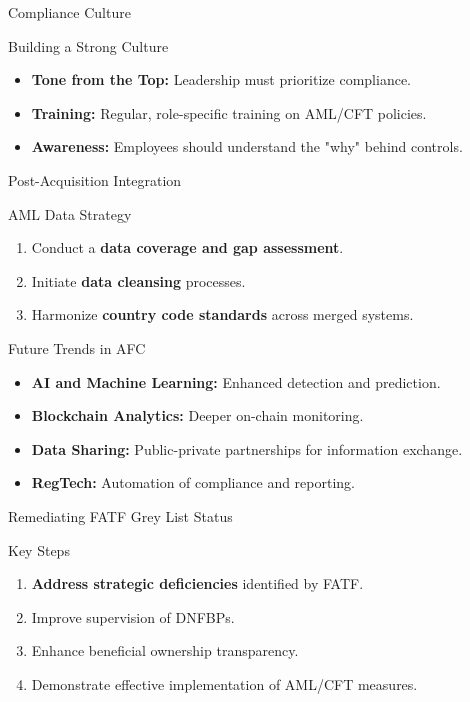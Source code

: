 \documentclass{beamer}
\begin{document}
	\begin{frame}{Compliance Culture}
		\begin{block}{Building a Strong Culture}
			\begin{itemize}
				\item \textbf{Tone from the Top:} Leadership must prioritize compliance.
				\item \textbf{Training:} Regular, role-specific training on AML/CFT policies.
				\item \textbf{Awareness:} Employees should understand the "why" behind controls.
			\end{itemize}
		\end{block}
	\end{frame}
	
	\begin{frame}{Post-Acquisition Integration}
		\begin{block}{AML Data Strategy}
			\begin{enumerate}
				\item Conduct a \textbf{data coverage and gap assessment}.
				\item Initiate \textbf{data cleansing} processes.
				\item Harmonize \textbf{country code standards} across merged systems.
			\end{enumerate}
		\end{block}
	\end{frame}
	
	\begin{frame}{Future Trends in AFC}
		\begin{itemize}
			\item \textbf{AI and Machine Learning:} Enhanced detection and prediction.
			\item \textbf{Blockchain Analytics:} Deeper on-chain monitoring.
			\item \textbf{Data Sharing:} Public-private partnerships for information exchange.
			\item \textbf{RegTech:} Automation of compliance and reporting.
		\end{itemize}
	\end{frame}
	
	\begin{frame}{Remediating FATF Grey List Status}
		\begin{block}{Key Steps}
			\begin{enumerate}
				\item \textbf{Address strategic deficiencies} identified by FATF.
				\item Improve supervision of DNFBPs.
				\item Enhance beneficial ownership transparency.
				\item Demonstrate effective implementation of AML/CFT measures.
			\end{enumerate}
		\end{block}
	\end{frame}
	
\end{document}
